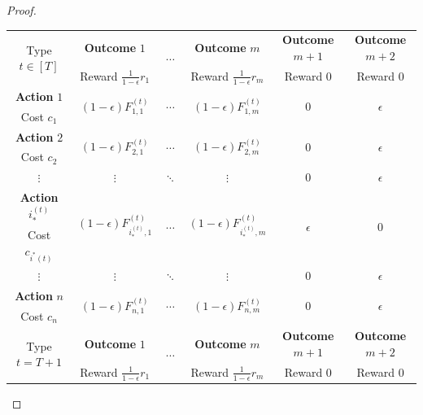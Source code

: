 \documentclass{article}
\newcommand{\cost}[1]{c_{#1}}
\newcommand{\TypedForecast}[3]{F^{(#1)}_{#2, #3}}
\newcommand{\reward}[1]{r_{#1}}
\newcommand{\OptimalAction}{i_*}
\newcommand{\TypedOptimalAction}[1]{\OptimalAction^{(#1)}}
\begin{document}
\begin{proof}
\begin{table}
\centering
\begin{tabular}{cccccc}
  \toprule
  \multirow{2}{*}{Type $t \in [T]$} & \textbf{Outcome} $1$                        & \multirow{2}{*}{$\cdots$} & \textbf{Outcome} $m$                        & \textbf{Outcome} $m+1$ & \textbf{Outcome} $m+2$ \\
                                    & Reward $\tfrac{1}{1 - \epsilon} \reward{1}$ &                           & Reward $\tfrac{1}{1 - \epsilon} \reward{m}$ & Reward $0$             & Reward $0$             \\ \midrule
  \textbf{Action} $1$ & \multirow{2}{*}{$(1 - \epsilon) \TypedForecast{t}{1}{1}$} & \multirow{2}{*}{$\cdots$} & \multirow{2}{*}{$(1 - \epsilon) \TypedForecast{t}{1}{m}$} & \multirow{2}{*}{$0$} & \multirow{2}{*}{$\epsilon$} \\ Cost $\cost{1}$ \\
  \textbf{Action} $2$ & \multirow{2}{*}{$(1 - \epsilon) \TypedForecast{t}{2}{1}$} & \multirow{2}{*}{$\cdots$} & \multirow{2}{*}{$(1 - \epsilon) \TypedForecast{t}{2}{m}$} & \multirow{2}{*}{$0$} & \multirow{2}{*}{$\epsilon$} \\ Cost $\cost{2}$ \\
  $\vdots$ & $\vdots$ & $\ddots$ & $\vdots$ & $0$ & $\epsilon$ \\
  \textbf{Action} $\TypedOptimalAction{t}$ & \multirow{2}{*}{$(1 - \epsilon) \TypedForecast{t}{\TypedOptimalAction{t}}{1}$} & \multirow{2}{*}{$\cdots$} & \multirow{2}{*}{$(1 - \epsilon) \TypedForecast{t}{\TypedOptimalAction{t}}{m}$} & \multirow{2}{*}{$\epsilon$} & \multirow{2}{*}{$0$} \\ Cost $\cost{i^*(t)}$ \\
  $\vdots$ & $\vdots$ & $\ddots$ & $\vdots$ & $0$ & $\epsilon$ \\
  \textbf{Action} $n$ & \multirow{2}{*}{$(1 - \epsilon) \TypedForecast{t}{n}{1}$} & \multirow{2}{*}{$\cdots$} & \multirow{2}{*}{$(1 - \epsilon) \TypedForecast{t}{n}{m}$} & \multirow{2}{*}{$0$} & \multirow{2}{*}{$\epsilon$} \\ Cost $\cost{n}$ \\ \midrule
  \multirow{2}{*}{Type $t = T + 1$} & \textbf{Outcome} $1$                        & \multirow{2}{*}{$\cdots$} & \textbf{Outcome} $m$                        & \textbf{Outcome} $m+1$ & \textbf{Outcome} $m+2$ \\
                                    & Reward $\tfrac{1}{1 - \epsilon} \reward{1}$ &                           & Reward $\tfrac{1}{1 - \epsilon} \reward{m}$ & Reward $0$             & Reward $0$             \\ \midrule

\end{tabular}
\end{table}
\end{proof}
\end{document}
